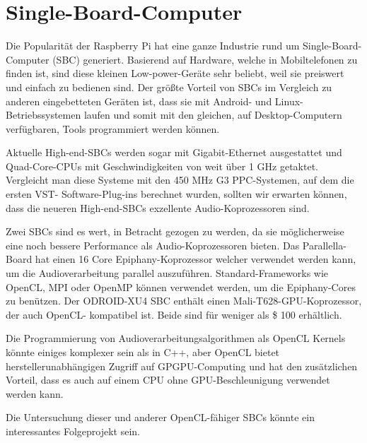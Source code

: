\section{Single-Board-Computer}

Die Popularität der Raspberry Pi hat eine ganze Industrie rund um Single-Board-Computer (SBC) generiert. Basierend auf Hardware, welche in Mobiltelefonen zu finden ist, sind diese kleinen Low-power-Geräte sehr beliebt, weil sie preiswert und einfach zu bedienen sind. Der größte Vorteil von SBCs im Vergleich zu anderen eingebetteten Geräten ist, dass sie mit Android- und Linux-Betriebssystemen laufen  und somit mit den gleichen, auf Desktop-Computern verfügbaren, Tools programmiert werden können.

Aktuelle High-end-SBCs werden sogar mit Gigabit-Ethernet ausgestattet und Quad-Core-CPUs mit Geschwindigkeiten von weit über 1 GHz getaktet. Vergleicht man diese Systeme mit den 450 MHz G3 PPC-Systemen, auf dem die ersten VST- Software-Plug-ins berechnet wurden, sollten wir erwarten können, dass die neueren High-end-SBCs exzellente Audio-Koprozessoren sind.

Zwei SBCs sind es wert, in Betracht gezogen zu werden, da sie möglicherweise eine noch bessere Performance als Audio-Koprozessoren bieten. Das Parallella-Board hat einen 16 Core Epiphany-Koprozessor welcher verwendet werden kann, um die Audioverarbeitung parallel auszuführen. Standard-Frameworks wie OpenCL, MPI oder OpenMP können verwendet werden, um die Epiphany-Cores zu benützen. Der ODROID-XU4 SBC enthält einen Mali-T628-GPU-Koprozessor, der auch OpenCL- kompatibel ist. Beide sind für weniger als \$ 100 erhältlich.

Die Programmierung von Audioverarbeitungsalgorithmen als OpenCL Kernels könnte einiges komplexer sein als in C++, aber OpenCL bietet herstellerunabhängigen Zugriff auf GPGPU-Computing und hat den zusätzlichen Vorteil, dass es auch auf einem CPU ohne GPU-Beschleunigung verwendet werden kann\cite{vst-gpu}.

Die Untersuchung dieser und anderer OpenCL-fähiger SBCs könnte ein interessantes Folgeprojekt sein.